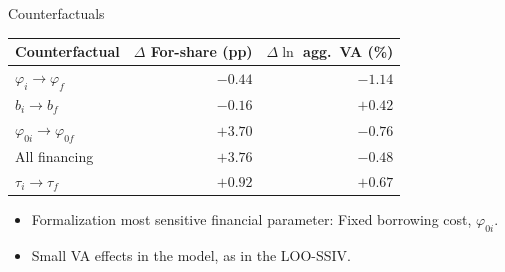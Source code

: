 \documentclass[11pt,aspectratio=169]{beamer}
\begin{document}
\begin{frame}{Counterfactuals}


\begin{center}
    \renewcommand{\arraystretch}{1.2}
    \begin{tabular}{lrr}
        \toprule
        Counterfactual & $\Delta$ For-share (pp) & $\Delta\ln$ agg.\ VA (\%) \\
        \midrule
        $\varphi_i \to \varphi_f$ & $-0.44$ & $-1.14$ \\
        $b_i \to b_f$ & $-0.16$ & $+0.42$ \\
        $\varphi_{0i} \to \varphi_{0f}$ & $+3.70$ & $-0.76$ \\
        All financing & $+3.76$ & $-0.48$ \\
        $\tau_i \to \tau_f$ & $+0.92$ & $+0.67$ \\
        \bottomrule
    \end{tabular}
\end{center}

\medskip
\begin{itemize}
  \item Formalization most sensitive financial parameter: Fixed borrowing cost, $\varphi_{0i}$.
  \item Small VA effects in the model, as in the LOO-SSIV.
\end{itemize}
\end{frame}
 
\end{document}
